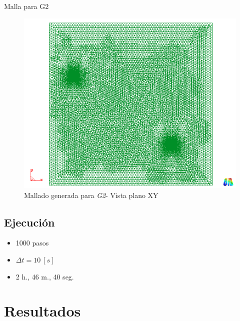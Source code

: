 \documentclass[spanish]{beamer}
\begin{document}
%
\begin{frame}{Malla para G2}\begin{center}
\begin{figure}[tbhp]
\centerline{\includegraphics[scale=0.25]{../img/200m/200_xy_contorno_malla}}
\caption{Mallado generada para \emph{G2}- Vista plano XY}
\label{200_xy_contorno_malla}
\end{figure}
\end{center}\end{frame}
\subsection{Ejecución}
\begin{frame}
\begin{itemize}
\item 1000 pasos
\item $\Delta t=10~[s]$
\item 2 h., 46 m., 40 seg.
\end{itemize}
\end{frame}
\section{Resultados}
%
\end{document}

